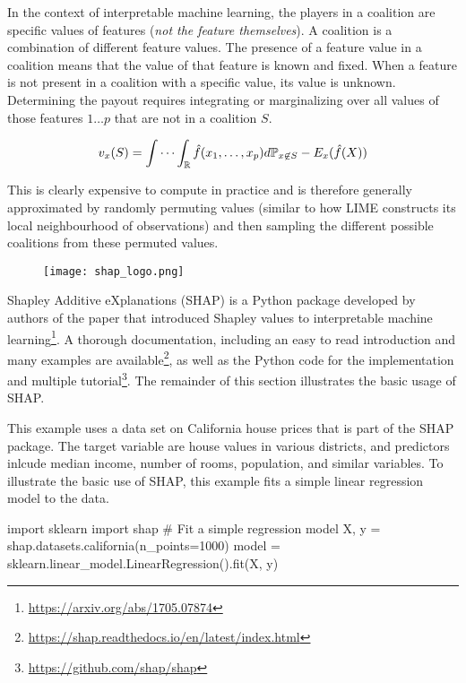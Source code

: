 In the context of interpretable machine learning, the players in a coalition are specific values of features (\emph{not the feature themselves}). A coalition is a combination of different feature values. The presence of a feature value in a coalition means that the value of that feature is known and fixed. When a feature is not present in a coalition with a specific value, its value is unknown. Determining the payout requires integrating or marginalizing over all values of those features $1 \ldots p$ that are not in a coalition $S$.

\begin{align*}
v_x(S) = \idotsint_\Bbb{R} \hat{f}(x_1, \ldots, x_p) d\Bbb{P}_{x \not\in S} - E_x(\hat{f}(X))
\end{align*}

This is clearly expensive to compute in practice and is therefore generally approximated by randomly permuting values (similar to how LIME constructs its local neighbourhood of observations) and then sampling the different possible coalitions from these permuted values. 

\vspace{2\baselineskip}

\begin{wrapfigure}{l}{1in}
\begin{center}
\texttt{[image: shap\_logo.png]}
\end{center}
\end{wrapfigure}
Shapley Additive eXplanations (SHAP) is a Python package developed by authors of the paper that introduced Shapley values to interpretable machine learning\footnote{\url{https://arxiv.org/abs/1705.07874}}. A thorough documentation, including an easy to read introduction and many examples are available\footnote{\url{https://shap.readthedocs.io/en/latest/index.html}}, as well as the Python code for the implementation and multiple tutorial\footnote{\url{https://github.com/shap/shap}}. The remainder of this section illustrates the basic usage of SHAP.

This example uses a data set on California house prices that is part of the SHAP package. The target variable are house values in various districts, and predictors inlcude median income, number of rooms, population, and similar variables. To illustrate the basic use of SHAP, this example fits a simple linear regression model to the data.

\begin{pythoncode}
import sklearn
import shap
# Fit a simple regression model
X, y = shap.datasets.california(n_points=1000)
model = sklearn.linear_model.LinearRegression().fit(X, y)
\end{pythoncode}

